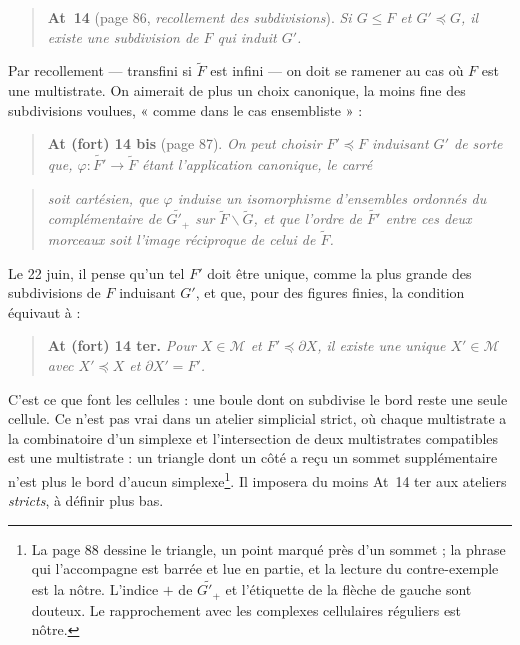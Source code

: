 \documentclass[11pt,a4paper]{article}
\begin{document}
\begin{quote}
\textbf{At~14} (page 86, \emph{recollement des subdivisions}). \emph{Si $G \leq F$
et $G' \preccurlyeq G$, il existe une subdivision de $F$ qui induit $G'$.}
\end{quote}

Par recollement --- transfini si $\widetilde{F}$ est infini --- on doit se ramener
au cas où $F$ est une multistrate. On aimerait de plus un choix canonique, la
moins fine des subdivisions voulues, « comme dans le cas ensembliste » :

\begin{quote}
\textbf{At (fort) 14 bis} (page 87). \emph{On peut choisir $F' \preccurlyeq F$
induisant $G'$ de sorte que, $\varphi : \widetilde{F'} \to \widetilde{F}$ étant
l'application canonique, le carré}
\end{quote}


\begin{quote}
\emph{soit cartésien, que $\varphi$ induise un isomorphisme d'ensembles ordonnés
du complémentaire de $\widetilde{G'_{+}}$ sur $\widetilde{F} \smallsetminus
\widetilde{G}$, et que l'ordre de $\widetilde{F'}$ entre ces deux morceaux soit
l'image réciproque de celui de $\widetilde{F}$.}
\end{quote}

Le 22 juin, il pense qu'un tel $F'$ doit être unique, comme la plus grande des
subdivisions de $F$ induisant $G'$, et que, pour des figures finies, la condition
équivaut à :

\begin{quote}
\textbf{At (fort) 14 ter.} \emph{Pour $X \in \mathcal{M}$ et $F' \preccurlyeq
\partial X$, il existe une unique $X' \in \mathcal{M}$ avec $X' \preccurlyeq X$ et
$\partial X' = F'$.}
\end{quote}

C'est ce que font les cellules : une boule dont on subdivise le bord reste une
seule cellule. Ce n'est pas vrai dans un atelier simplicial strict, où chaque
multistrate a la combinatoire d'un simplexe et l'intersection de deux
multistrates compatibles est une multistrate : un triangle dont un côté a reçu un
sommet supplémentaire n'est plus le bord d'aucun simplexe\footnote{La page 88
dessine le triangle, un point marqué près d'un sommet ; la phrase qui
l'accompagne est barrée et lue en partie, et la lecture du contre-exemple est la
nôtre. L'indice $+$ de $\widetilde{G'_{+}}$ et l'étiquette de la flèche de gauche
sont douteux. Le rapprochement avec les complexes cellulaires réguliers est
nôtre.}. Il imposera du moins At~14 ter aux ateliers \emph{stricts}, à définir
plus bas.
\end{document}
